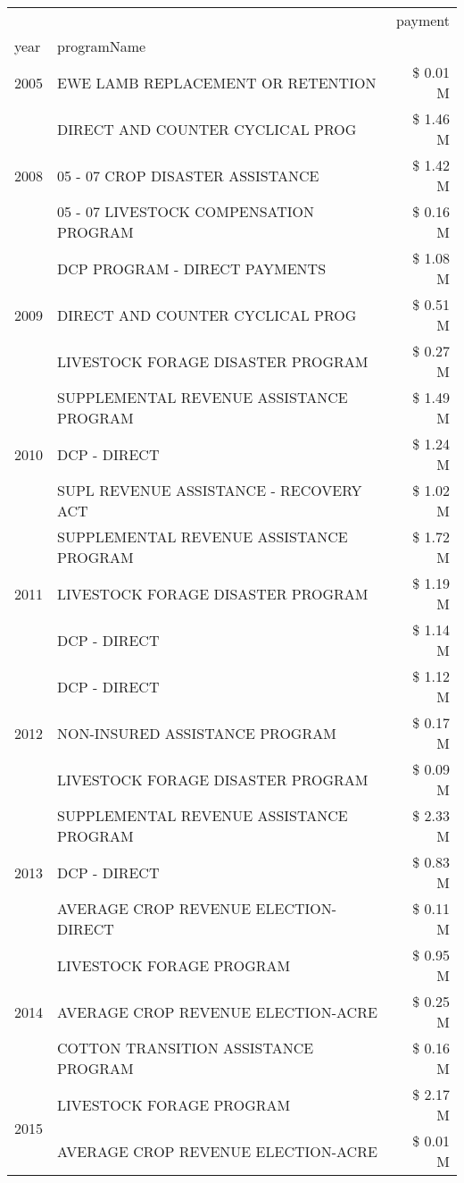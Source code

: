\begin{tabular}{llr}
\toprule
 &  & payment \\
year & programName &  \\
\midrule
2005 & EWE LAMB REPLACEMENT OR RETENTION & \$ 0.01 M \\
\cline{1-3}
\multirow[t]{3}{*}{2008} & DIRECT AND COUNTER CYCLICAL PROG & \$ 1.46 M \\
 & 05 - 07 CROP DISASTER ASSISTANCE & \$ 1.42 M \\
 & 05 - 07 LIVESTOCK COMPENSATION PROGRAM & \$ 0.16 M \\
\cline{1-3}
\multirow[t]{3}{*}{2009} & DCP PROGRAM - DIRECT PAYMENTS & \$ 1.08 M \\
 & DIRECT AND COUNTER CYCLICAL PROG & \$ 0.51 M \\
 & LIVESTOCK FORAGE DISASTER  PROGRAM & \$ 0.27 M \\
\cline{1-3}
\multirow[t]{3}{*}{2010} & SUPPLEMENTAL REVENUE ASSISTANCE PROGRAM & \$ 1.49 M \\
 & DCP - DIRECT & \$ 1.24 M \\
 & SUPL REVENUE ASSISTANCE - RECOVERY ACT & \$ 1.02 M \\
\cline{1-3}
\multirow[t]{3}{*}{2011} & SUPPLEMENTAL REVENUE ASSISTANCE PROGRAM & \$ 1.72 M \\
 & LIVESTOCK FORAGE DISASTER PROGRAM & \$ 1.19 M \\
 & DCP - DIRECT & \$ 1.14 M \\
\cline{1-3}
\multirow[t]{3}{*}{2012} & DCP - DIRECT & \$ 1.12 M \\
 & NON-INSURED ASSISTANCE PROGRAM & \$ 0.17 M \\
 & LIVESTOCK FORAGE DISASTER PROGRAM & \$ 0.09 M \\
\cline{1-3}
\multirow[t]{3}{*}{2013} & SUPPLEMENTAL REVENUE ASSISTANCE PROGRAM & \$ 2.33 M \\
 & DCP - DIRECT & \$ 0.83 M \\
 & AVERAGE CROP REVENUE ELECTION-DIRECT & \$ 0.11 M \\
\cline{1-3}
\multirow[t]{3}{*}{2014} & LIVESTOCK FORAGE PROGRAM & \$ 0.95 M \\
 & AVERAGE CROP REVENUE ELECTION-ACRE & \$ 0.25 M \\
 & COTTON TRANSITION ASSISTANCE PROGRAM & \$ 0.16 M \\
\cline{1-3}
\multirow[t]{3}{*}{2015} & LIVESTOCK FORAGE PROGRAM & \$ 2.17 M \\
 & AVERAGE CROP REVENUE ELECTION-ACRE & \$ 0.01 M \\

\end{tabular}
